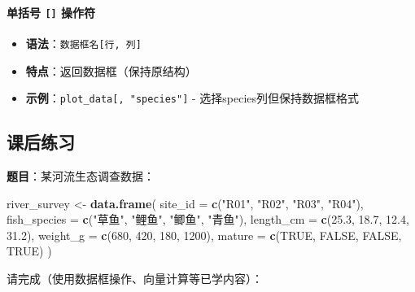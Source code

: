 \documentclass[
  twoside]{book}
\newenvironment{Shaded}{\begin{snugshade}}{\end{snugshade}}
\newcommand{\AttributeTok}[1]{\textcolor[rgb]{0.13,0.29,0.53}{#1}}
\newcommand{\ConstantTok}[1]{\textcolor[rgb]{0.56,0.35,0.01}{#1}}
\newcommand{\DecValTok}[1]{\textcolor[rgb]{0.00,0.00,0.81}{#1}}
\newcommand{\FloatTok}[1]{\textcolor[rgb]{0.00,0.00,0.81}{#1}}
\newcommand{\FunctionTok}[1]{\textcolor[rgb]{0.13,0.29,0.53}{\textbf{#1}}}
\newcommand{\NormalTok}[1]{#1}
\newcommand{\OtherTok}[1]{\textcolor[rgb]{0.56,0.35,0.01}{#1}}
\newcommand{\StringTok}[1]{\textcolor[rgb]{0.31,0.60,0.02}{#1}}
\providecommand{\tightlist}{%
  \setlength{\itemsep}{0pt}\setlength{\parskip}{0pt}}
\begin{document}
\hypertarget{ux5355ux62ecux53f7-ux64cdux4f5cux7b26}{%
\paragraph{\texorpdfstring{单括号 \texttt{{[}{]}} 操作符}{单括号 {[}{]} 操作符}}\label{ux5355ux62ecux53f7-ux64cdux4f5cux7b26}}

\begin{itemize}
\tightlist
\item
  \textbf{语法}：\texttt{数据框名{[}行,\ 列{]}}
\item
  \textbf{特点}：返回数据框（保持原结构）
\item
  \textbf{示例}：\texttt{plot\_data{[},\ "species"{]}} - 选择species列但保持数据框格式
\end{itemize}

\hypertarget{ux8bfeux540eux7ec3ux4e60-2}{%
\subsection{课后练习}\label{ux8bfeux540eux7ec3ux4e60-2}}

\textbf{题目}：某河流生态调查数据：

\begin{Shaded}
\begin{Highlighting}[]
\NormalTok{river\_survey }\OtherTok{\textless{}{-}} \FunctionTok{data.frame}\NormalTok{(}
  \AttributeTok{site\_id =} \FunctionTok{c}\NormalTok{(}\StringTok{"R01"}\NormalTok{, }\StringTok{"R02"}\NormalTok{, }\StringTok{"R03"}\NormalTok{, }\StringTok{"R04"}\NormalTok{),}
  \AttributeTok{fish\_species =} \FunctionTok{c}\NormalTok{(}\StringTok{"草鱼"}\NormalTok{, }\StringTok{"鲤鱼"}\NormalTok{, }\StringTok{"鲫鱼"}\NormalTok{, }\StringTok{"青鱼"}\NormalTok{),}
  \AttributeTok{length\_cm =} \FunctionTok{c}\NormalTok{(}\FloatTok{25.3}\NormalTok{, }\FloatTok{18.7}\NormalTok{, }\FloatTok{12.4}\NormalTok{, }\FloatTok{31.2}\NormalTok{),}
  \AttributeTok{weight\_g =} \FunctionTok{c}\NormalTok{(}\DecValTok{680}\NormalTok{, }\DecValTok{420}\NormalTok{, }\DecValTok{180}\NormalTok{, }\DecValTok{1200}\NormalTok{),}
  \AttributeTok{mature =} \FunctionTok{c}\NormalTok{(}\ConstantTok{TRUE}\NormalTok{, }\ConstantTok{FALSE}\NormalTok{, }\ConstantTok{FALSE}\NormalTok{, }\ConstantTok{TRUE}\NormalTok{)}
\NormalTok{)}
\end{Highlighting}
\end{Shaded}

请完成（使用数据框操作、向量计算等已学内容）：
\end{document}
